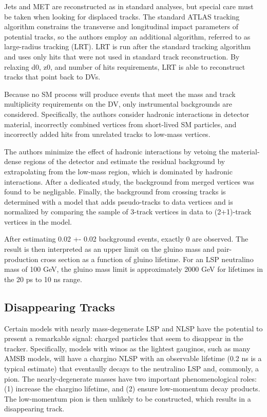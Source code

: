 \documentclass[12pt]{article}
\begin{document}
    Jets and MET are reconstructed as in standard analyses, but special care must be taken when looking for displaced tracks. The standard ATLAS tracking algorithm constrains the transverse and longitudinal impact parameters of potential tracks, so the authors employ an additional algorithm, referred to as large-radius tracking (LRT). LRT is run after the standard tracking algorithm and uses only hits that were not used in standard track reconstruction. By relaxing d0, z0, and number of hits requirements, LRT is able to reconstruct tracks that point back to DVs.
    
    Because no SM process will produce events that meet the mass and track multiplicity requirements on the DV, only instrumental backgrounds are considered. Specifically, the authors consider hadronic interactions in detector material, incorrectly combined vertices from short-lived SM particles, and incorrectly added hits from unrelated tracks to low-mass vertices.

    The authors minimize the effect of hadronic interactions by vetoing the material-dense regions of the detector and estimate the residual background by extrapolating from the low-mass region, which is dominated by hadronic interactions. After a dedicated study, the background from merged vertices was found to be negligable. Finally, the background from crossing tracks is determined with a model that adds pseudo-tracks to data vertices and is normalized by comparing the sample of 3-track vertices in data to (2+1)-track vertices in the model.

    After estimating 0.02 +- 0.02 background events, exactly 0 are observed. The result is then interpreted as an upper limit on the gluino mass and pair-production cross section as a function of gluino lifetime. For an LSP neutralino mass of 100 GeV, the gluino mass limit is approximately 2000 GeV for lifetimes in the 20 ps to 10 ns range. 

\subsection{Disappearing Tracks}
    Certain models with nearly mass-degenerate LSP and NLSP have the potential to present a remarkable signal: charged particles that seem to disappear in the tracker. Specifically, models with winos as the lightest gauginos, such as many AMSB models, will have a chargino NLSP with an observable lifetime (0.2 ns is a typical estimate) that eventaully decays to the neutralino LSP and, commonly, a pion. The nearly-degenerate masses have two important phenomenological roles: (1) increase the chargino lifetime, and (2) ensure low-momentum decay products. The low-momentum pion is then unlikely to be constructed, which results in a disappearing track.
\end{document}
